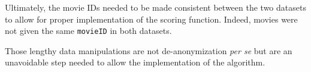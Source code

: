 Ultimately, the movie IDs needed to be made consistent between the two datasets to allow for proper implementation of the scoring function. Indeed, movies were not given the same \texttt{movieID} in both datasets.

Those lengthy data manipulations are not de-anonymization \textit{per se} but are an unavoidable step needed to allow the implementation of the algorithm.